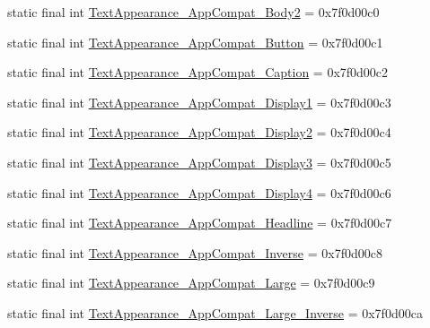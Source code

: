 \begin{DoxyCompactItemize}
\item 
static final int \mbox{\hyperlink{classandroid_1_1support_1_1v7_1_1appcompat_1_1_r_1_1style_af4f8889eec33c1bb9086e718a767fdb2}{Text\+Appearance\+\_\+\+App\+Compat\+\_\+\+Body2}} = 0x7f0d00c0
\item 
static final int \mbox{\hyperlink{classandroid_1_1support_1_1v7_1_1appcompat_1_1_r_1_1style_aa801b76dbf3b1122307d7c57c10abcc1}{Text\+Appearance\+\_\+\+App\+Compat\+\_\+\+Button}} = 0x7f0d00c1
\item 
static final int \mbox{\hyperlink{classandroid_1_1support_1_1v7_1_1appcompat_1_1_r_1_1style_aa31b7e463497b5c15b8f6cdf69aa09b5}{Text\+Appearance\+\_\+\+App\+Compat\+\_\+\+Caption}} = 0x7f0d00c2
\item 
static final int \mbox{\hyperlink{classandroid_1_1support_1_1v7_1_1appcompat_1_1_r_1_1style_a0623e3bb13bb0517311ed9a7f9fd906e}{Text\+Appearance\+\_\+\+App\+Compat\+\_\+\+Display1}} = 0x7f0d00c3
\item 
static final int \mbox{\hyperlink{classandroid_1_1support_1_1v7_1_1appcompat_1_1_r_1_1style_a636c4fa0b00194984dcf32557818d992}{Text\+Appearance\+\_\+\+App\+Compat\+\_\+\+Display2}} = 0x7f0d00c4
\item 
static final int \mbox{\hyperlink{classandroid_1_1support_1_1v7_1_1appcompat_1_1_r_1_1style_a4bb50602a7395cbb4de22e4dd4c182c3}{Text\+Appearance\+\_\+\+App\+Compat\+\_\+\+Display3}} = 0x7f0d00c5
\item 
static final int \mbox{\hyperlink{classandroid_1_1support_1_1v7_1_1appcompat_1_1_r_1_1style_af6a39a4f5ad54f4ff593b4c4e118b1ec}{Text\+Appearance\+\_\+\+App\+Compat\+\_\+\+Display4}} = 0x7f0d00c6
\item 
static final int \mbox{\hyperlink{classandroid_1_1support_1_1v7_1_1appcompat_1_1_r_1_1style_aa40c94de107d982632d5f5cefb8af742}{Text\+Appearance\+\_\+\+App\+Compat\+\_\+\+Headline}} = 0x7f0d00c7
\item 
static final int \mbox{\hyperlink{classandroid_1_1support_1_1v7_1_1appcompat_1_1_r_1_1style_a3b1f6191b46f580988a5d7ce1be8442e}{Text\+Appearance\+\_\+\+App\+Compat\+\_\+\+Inverse}} = 0x7f0d00c8
\item 
static final int \mbox{\hyperlink{classandroid_1_1support_1_1v7_1_1appcompat_1_1_r_1_1style_a0f7c87ccc9f28664a827645d6c661adb}{Text\+Appearance\+\_\+\+App\+Compat\+\_\+\+Large}} = 0x7f0d00c9
\item 
static final int \mbox{\hyperlink{classandroid_1_1support_1_1v7_1_1appcompat_1_1_r_1_1style_a1cd2cf2f498da3bce4450a09defe45cb}{Text\+Appearance\+\_\+\+App\+Compat\+\_\+\+Large\+\_\+\+Inverse}} = 0x7f0d00ca

\end{DoxyCompactItemize}
